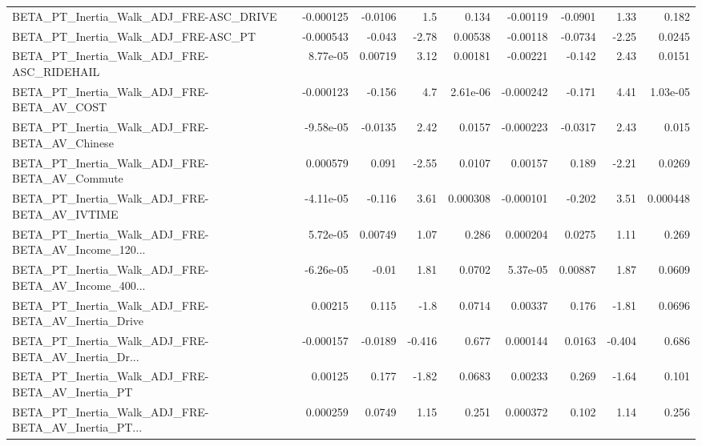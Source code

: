 \begin{tabular}{lrrrrrrrr}
BETA\_PT\_Inertia\_Walk\_ADJ\_FRE-ASC\_DRIVE             &   -0.000125 &      -0.0106 &      1.5 &    0.134 &   -0.00119 &     -0.0901 &         1.33 &         0.182 \\
BETA\_PT\_Inertia\_Walk\_ADJ\_FRE-ASC\_PT                &   -0.000543 &       -0.043 &    -2.78 &  0.00538 &   -0.00118 &     -0.0734 &        -2.25 &        0.0245 \\
BETA\_PT\_Inertia\_Walk\_ADJ\_FRE-ASC\_RIDEHAIL          &    8.77e-05 &      0.00719 &     3.12 &  0.00181 &   -0.00221 &      -0.142 &         2.43 &        0.0151 \\
BETA\_PT\_Inertia\_Walk\_ADJ\_FRE-BETA\_AV\_COST          &   -0.000123 &       -0.156 &      4.7 & 2.61e-06 &  -0.000242 &      -0.171 &         4.41 &      1.03e-05 \\
BETA\_PT\_Inertia\_Walk\_ADJ\_FRE-BETA\_AV\_Chinese       &   -9.58e-05 &      -0.0135 &     2.42 &   0.0157 &  -0.000223 &     -0.0317 &         2.43 &         0.015 \\
BETA\_PT\_Inertia\_Walk\_ADJ\_FRE-BETA\_AV\_Commute       &    0.000579 &        0.091 &    -2.55 &   0.0107 &    0.00157 &       0.189 &        -2.21 &        0.0269 \\
BETA\_PT\_Inertia\_Walk\_ADJ\_FRE-BETA\_AV\_IVTIME        &   -4.11e-05 &       -0.116 &     3.61 & 0.000308 &  -0.000101 &      -0.202 &         3.51 &      0.000448 \\
BETA\_PT\_Inertia\_Walk\_ADJ\_FRE-BETA\_AV\_Income\_120... &    5.72e-05 &      0.00749 &     1.07 &    0.286 &   0.000204 &      0.0275 &         1.11 &         0.269 \\
BETA\_PT\_Inertia\_Walk\_ADJ\_FRE-BETA\_AV\_Income\_400... &   -6.26e-05 &        -0.01 &     1.81 &   0.0702 &   5.37e-05 &     0.00887 &         1.87 &        0.0609 \\
BETA\_PT\_Inertia\_Walk\_ADJ\_FRE-BETA\_AV\_Inertia\_Drive &     0.00215 &        0.115 &     -1.8 &   0.0714 &    0.00337 &       0.176 &        -1.81 &        0.0696 \\
BETA\_PT\_Inertia\_Walk\_ADJ\_FRE-BETA\_AV\_Inertia\_Dr... &   -0.000157 &      -0.0189 &   -0.416 &    0.677 &   0.000144 &      0.0163 &       -0.404 &         0.686 \\
BETA\_PT\_Inertia\_Walk\_ADJ\_FRE-BETA\_AV\_Inertia\_PT    &     0.00125 &        0.177 &    -1.82 &   0.0683 &    0.00233 &       0.269 &        -1.64 &         0.101 \\
BETA\_PT\_Inertia\_Walk\_ADJ\_FRE-BETA\_AV\_Inertia\_PT... &    0.000259 &       0.0749 &     1.15 &    0.251 &   0.000372 &       0.102 &         1.14 &         0.256 \\

\end{tabular}
